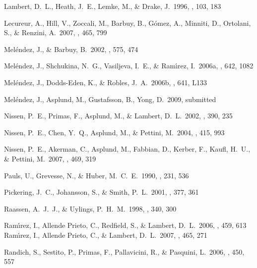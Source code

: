 \documentclass[traditabstract]{aa} %
\begin{document}
\begin{thebibliography}{}
 Lambert, D.~L., Heath, 
J.~E., Lemke, M., \& Drake, J.\ 1996, \apjs, 103, 183 

 Lecureur, A., Hill, V., Zoccali, M., Barbuy, B., G{\'o}mez, A., Minniti, D., Ortolani, S., \& Renzini, A.\ 2007, \aap, 465, 799 

 Mel{\'e}ndez, J., \& Barbuy, B.\ 2002, \apj, 575, 474 

 Mel{\'e}ndez, J., 
Shchukina, N.~G., Vasiljeva, I.~E., \& Ram{\'{\i}}rez, I.\ 2006a, \apj, 642, 1082 

 Mel{\'e}ndez, J., 
Dodds-Eden, K., \& Robles, J.~A.\ 2006b, \apjl, 641, L133 

 Mel{\'e}ndez, J., 
Asplund, M., Gustafsson, B., Yong, D.\ 2009, submitted 

 Nissen, P.~E., Primas, F., Asplund, M., \& Lambert, D.~L.\ 2002, \aap, 390, 235 

 Nissen, P.~E., Chen, Y.~Q., Asplund, M., \& Pettini, M.\ 2004, \aap, 415, 993 


 Nissen, P.~E., Akerman, C., Asplund, M., Fabbian, D., Kerber, F., Kaufl, H.~U., \& Pettini, M.\ 2007, \aap, 469, 319 

 Pauls, U., Grevesse, N., \& Huber, M.~C.~E.\ 1990, \aap, 231, 536 

 Pickering, J.~C., Johansson, S., \& Smith, P.~L.\ 2001, \aap, 377, 361 

 Raassen, A.~J.~J., \& Uylings, P.~H.~M.\ 1998, \aap, 340, 300 


 Ram{\'{\i}}rez, I., Allende Prieto, C., Redfield, S., \& Lambert, D.~L.\ 2006, \aap, 459, 613 
 Ram{\'{\i}}rez, I., Allende Prieto, C., \& Lambert, D.~L.\ 2007, \aap, 465, 271 

 Randich, S., Sestito, P., Primas, F., Pallavicini, R., \& Pasquini, L.\ 2006, \aap, 450, 557 



\end{thebibliography}
\end{document}
